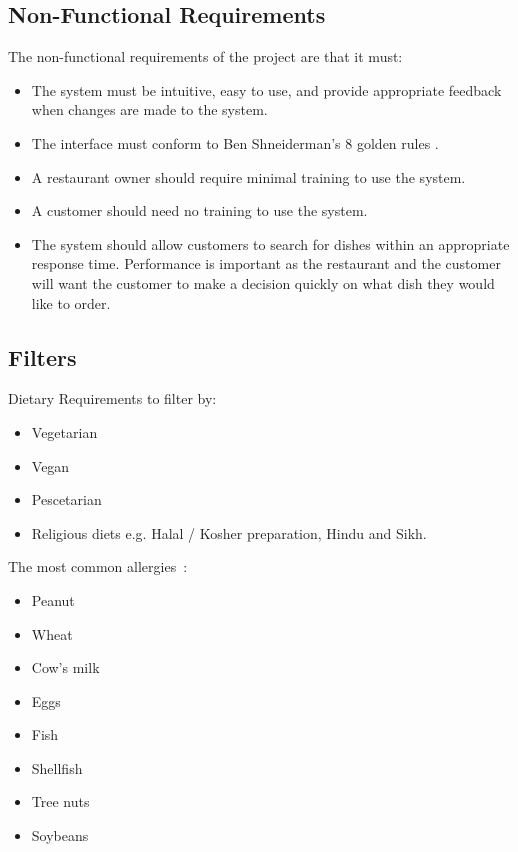\subsection{Non-Functional Requirements}

The non-functional requirements of the project are that it must:

\begin{itemize}
\item The system must be intuitive, easy to use, and provide appropriate feedback when changes are made to the system.
\item The interface must conform to Ben Shneiderman's 8 golden rules \cite{shneiderman}.
\item A restaurant owner should require minimal training to use the system.
\item A customer should need no training to use the system.
\item The system should allow customers to search for dishes within an appropriate response time. Performance is important as the restaurant and the customer will want the customer to make a decision quickly on what dish they would like to order.
\end{itemize}

\subsection{Filters}

Dietary Requirements to filter by:

\begin{itemize}
\item Vegetarian
\item Vegan
\item Pescetarian
\item Religious diets e.g. Halal / Kosher preparation, Hindu and Sikh.
\end{itemize}

The most common allergies~\cite{burks2001food}:

\begin{itemize}
\item Peanut
\item Wheat
\item Cow's milk
\item Eggs
\item Fish
\item Shellfish
\item Tree nuts
\item Soybeans
\end{itemize}

